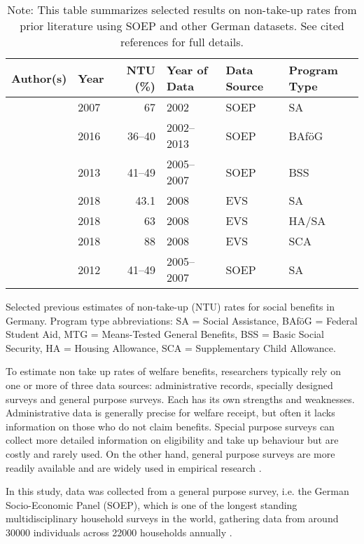 \begin{table}[htbp]
\centering
\begin{tabular}{llrlll}
\toprule
\textbf{Author(s)} & \textbf{Year} & \textbf{NTU (\%)} & \textbf{Year of Data} & \textbf{Data Source} & \textbf{Program Type} \\
\midrule
\citeauthor{frick_claim_2007} & 2007 & 67 & 2002 & SOEP & SA \\
\citeauthor{herber_non-take-up_2019} & 2016 & 36--40 & 2002--2013 & SOEP & BAföG \\
\citeauthor{RePEc:iab:iabfob:201305} & 2013 & 41--49 & 2005--2007 & SOEP & BSS \\
\citeauthor{bruckmeier_benefit_2018} & 2018 & 43.1 & 2008 & EVS & SA \\
\citeauthor{bruckmeier_benefit_2018} & 2018 & 63 & 2008 & EVS & HA/SA \\
\citeauthor{bruckmeier_benefit_2018} & 2018 & 88 & 2008 & EVS & SCA \\
\citeauthor{bruckmeier_new_2012}  & 2012 & 41--49 & 2005--2007 & SOEP & SA \\
\bottomrule
\end{tabular}
\caption{Selected previous estimates of non-take-up (NTU) rates for social benefits in Germany. Program type abbreviations: SA = Social Assistance, BAföG = Federal Student Aid, MTG = Means-Tested General Benefits, BSS = Basic Social Security, HA = Housing Allowance, SCA = Supplementary Child Allowance.}
\caption*{\small{Note: This table summarizes selected results on non-take-up rates from prior literature using SOEP and other German datasets. See cited references for full details.}}
\label{table:NTU-studies}
\end{table}

To estimate non take up rates of welfare benefits, researchers typically rely on one or more of three data sources: administrative records, specially designed surveys and general purpose surveys. Each has its own strengths and weaknesses. Administrative data is generally precise for welfare receipt, but often it lacks information on those who do not claim benefits. Special purpose surveys can collect more detailed information on eligibility and take up behaviour but are costly and rarely used. On the other hand, general purpose surveys are more readily available and are widely used in empirical research \citep{mechelen_who_2017}.

In this study, data was collected from a general purpose survey, i.e. the German Socio-Economic Panel (SOEP), which is one of the longest standing multidisciplinary household surveys in the world, gathering data from around 30000 individuals across 22000 households annually \citep{berlin_diw_nodate}.

